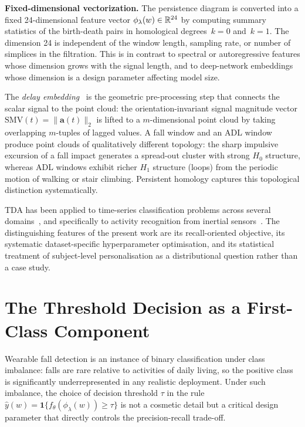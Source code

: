 \textbf{Fixed-dimensional vectorization.}  The persistence diagram is converted into
a fixed 24-dimensional feature vector $\phi_\lambda(w)\in\mathbb{R}^{24}$ by computing
summary statistics of the birth-death pairs in homological degrees~$k=0$ and~$k=1$.
The dimension 24 is independent of the window length, sampling rate, or number of
simplices in the filtration.  This is in contrast to spectral or autoregressive
features whose dimension grows with the signal length, and to deep-network embeddings
whose dimension is a design parameter affecting model size.

The \emph{delay embedding}~\parencite{takens1981detecting} is the geometric pre-processing
step that connects the scalar signal to the point cloud: the orientation-invariant
signal magnitude vector $\mathrm{SMV}(t)=\|\mathbf{a}(t)\|_2$ is lifted to a
$m$-dimensional point cloud by taking overlapping $m$-tuples of lagged values.  A
fall window and an ADL window produce point clouds of qualitatively different
topology: the sharp impulsive excursion of a fall impact generates a spread-out
cluster with strong $H_0$ structure, whereas ADL windows exhibit richer $H_1$
structure (loops) from the periodic motion of walking or stair climbing.  Persistent
homology captures this topological distinction systematically.

TDA has been applied to time-series classification problems across several
domains~\parencite{gidea2018topological, pereira2015persistent, umeda2017time}, and
specifically to activity recognition from inertial
sensors~\parencite{xu2019topological, ott2017topological}.  The distinguishing features
of the present work are its recall-oriented objective, its systematic dataset-specific
hyperparameter optimisation, and its statistical treatment of subject-level
personalisation as a distributional question rather than a case study.

\section{The Threshold Decision as a First-Class Component}
\label{subsec:threshold-intro}

Wearable fall detection is an instance of binary classification under class imbalance:
falls are rare relative to activities of daily living, so the positive class is
significantly underrepresented in any realistic deployment.  Under such imbalance,
the choice of decision threshold $\tau$ in the rule
$\widehat{y}(w)=\mathbf{1}\{f_\theta(\phi_\lambda(w))\geq\tau\}$
is not a cosmetic detail but a critical design parameter that directly controls the
precision-recall trade-off.

